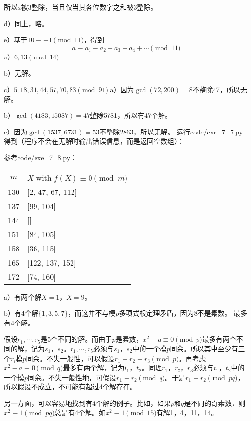 所以$a$被3整除，当且仅当其各位数字之和被3整除。\par
d）同上，略。\par
e）基于$10\equiv -1\pmod{11}$，得到
\[a\equiv a_1-a_2+a_3-a_4+\cdots\pmod{11}\]
%
\exercise a）$6,13\pmod{14}$\par
b）无解。\par
c）$5,18,31,44,57,70,83\pmod{91}$
%
\exercise a）因为$\gcd(72,200)=8$不整除47，所以无解。\par
b）$\gcd(4183, 15087)=47$整除5781，所以有47个解。\par
c）因为$\gcd(1537,6731)=53$不整除2863，所以无解。
%
\exercise 运行code/exe\_7\_7.py得到（程序不会在无解时输出错误信息，而是返回空数组）：\par
[]\par
[225, 546, 867, 1188, 1509, 1830, 2151, 2472, 2793, 3114, 3435, 3756, 4077, 4398, 4719, 5040, 5361, 5682, 6003, 6324, 6645, 6966, 7287, 7608, 7929, 8250, 8571, 8892, 9213, 9534, 9855, 10176, 10497, 10818, 11139, 11460, 11781, 12102, 12423, 12744, 13065, 13386, 13707, 14028, 14349, 14670, 14991]\par
[]
%
\exercise 参考code/exe\_7\_8.py：
\begin{center}
\begin{tabular}{c|l}
$m$ & $X$ with $f(X)\equiv0\pmod m$ \\
130 & [2, 47, 67, 112] \\
137 & [99, 104] \\
144 & [] \\
151 & [84, 105] \\
158 & [36, 115] \\
165 & [122, 137, 152] \\
172 & [74, 160] \\
\end{tabular}
\end{center}
%
\exercise a）有两个解$X=1$，$X=9$。\par
b）有4个解$\{1,3,5,7\}$，而这并不与模$p$多项式根定理矛盾，因为8不是素数。
%
\exercise 最多有4个解。\par
\proof 假设$r_1,\cdots,r_5$是5个不同的解。而由于$p$是素数，$x^2-a\equiv0\pmod p$最多有两个不同的解，记为$s_1$，$s_2$。$r_1,\cdots,r_5$必须与$s_1$，$s_2$中的一个模$p$同余。所以其中至少有三个$r_i$模$p$同余。不失一般性，可以假设$r_1\equiv r_2\equiv r_3\pmod p$。再考虑$x^2-a\equiv0\pmod q$最多有两个解，记为$t_1$，$t_2$。同理$r_1$，$r_2$，$r_3$必须与$t_1$，$t_2$中的一个模$p$同余。不失一般性地，可假设$r_1\equiv r_2\pmod q$。于是$r_1\equiv r_2\pmod{pq}$，所以假设不成立，不可能有超过4个解存在。\par
另一方面，可以容易地找到有4个解的例子。比如，如果$p$和$q$是不同的奇素数，则$x^2\equiv 1\pmod{pq}$总是有4个解。如$x^2\equiv 1\pmod{15}$有解1，4，11，14。